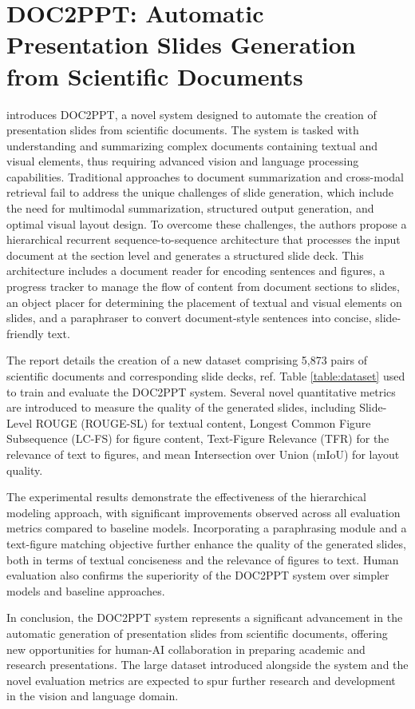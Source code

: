 \section{DOC2PPT: Automatic Presentation Slides Generation from Scientific Documents}

\citet{Fu:2022:AAAI} introduces DOC2PPT, a novel system designed to automate the creation of presentation slides from scientific documents. The system is tasked with understanding and summarizing complex documents containing textual and visual elements, thus requiring advanced vision and language processing capabilities. Traditional approaches to document summarization and cross-modal retrieval fail to address the unique challenges of slide generation, which include the need for multimodal summarization, structured output generation, and optimal visual layout design. To overcome these challenges, the authors propose a hierarchical recurrent sequence-to-sequence architecture that processes the input document at the section level and generates a structured slide deck. This architecture includes a document reader for encoding sentences and figures, a progress tracker to manage the flow of content from document sections to slides, an object placer for determining the placement of textual and visual elements on slides, and a paraphraser to convert document-style sentences into concise, slide-friendly text.

The report details the creation of a new dataset comprising 5,873 pairs of scientific documents and corresponding slide decks, ref. Table \ref{table:dataset} used to train and evaluate the DOC2PPT system. Several novel quantitative metrics are introduced to measure the quality of the generated slides, including Slide-Level ROUGE (ROUGE-SL) for textual content, Longest Common Figure Subsequence (LC-FS) for figure content, Text-Figure Relevance (TFR) for the relevance of text to figures, and mean Intersection over Union (mIoU) for layout quality.

The experimental results demonstrate the effectiveness of the hierarchical modeling approach, with significant improvements observed across all evaluation metrics compared to baseline models. Incorporating a paraphrasing module and a text-figure matching objective further enhance the quality of the generated slides, both in terms of textual conciseness and the relevance of figures to text. Human evaluation also confirms the superiority of the DOC2PPT system over simpler models and baseline approaches.

In conclusion, the DOC2PPT system represents a significant advancement in the automatic generation of presentation slides from scientific documents, offering new opportunities for human-AI collaboration in preparing academic and research presentations. The large dataset introduced alongside the system and the novel evaluation metrics are expected to spur further research and development in the vision and language domain.

